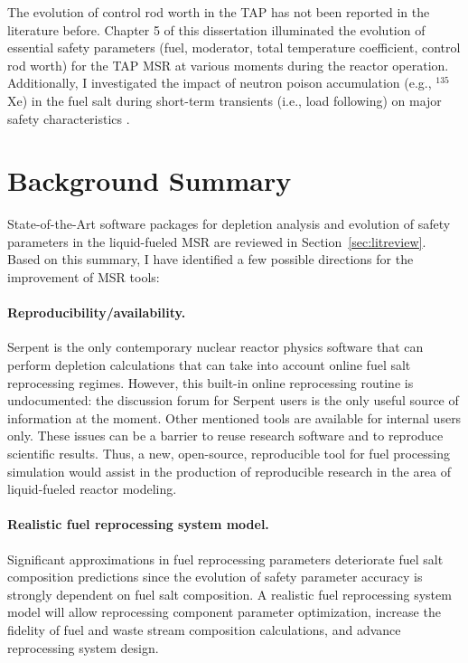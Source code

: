 The evolution of control rod worth in the \gls{TAP} has not been reported in 
the literature before. Chapter 5 of this dissertation illuminated the 
evolution of essential safety parameters (fuel, moderator, total temperature 
coefficient, control rod worth) for the \gls{TAP} \gls{MSR} at various moments 
during the reactor operation. Additionally, I investigated the impact of 
neutron poison accumulation (e.g., $^{135}$Xe) in the fuel salt during 
short-term transients (i.e., load following) on major safety characteristics 
\cite{rykhlevskii_impact_2019}.


\section{Background Summary}
State-of-the-Art software packages for depletion analysis and evolution of 
safety parameters in the liquid-fueled \gls{MSR} are reviewed in 
Section~\ref{sec:litreview}. Based on this summary, I have identified a few 
possible directions for the improvement of \gls{MSR} tools:
\paragraph*{Reproducibility/availability.}
Serpent is the only contemporary nuclear reactor physics software that can 
perform depletion calculations that can take into account online fuel salt 
reprocessing regimes. However, this built-in online reprocessing routine is 
undocumented: the discussion forum for Serpent users is the only useful 
source of information at the moment. Other mentioned tools are available for 
internal users only. These issues can be a barrier to reuse research software 
and to reproduce scientific results. Thus, a new, open-source, reproducible 
tool for fuel processing simulation would assist in the production of 
reproducible research in the area of liquid-fueled reactor modeling.
\paragraph*{Realistic fuel reprocessing system model.} 
Significant approximations in fuel reprocessing parameters deteriorate fuel 
salt composition predictions since the evolution of safety parameter accuracy 
is strongly dependent on fuel salt composition. A realistic fuel reprocessing 
system model will allow reprocessing component parameter optimization,  
increase the fidelity of fuel and waste stream composition calculations, and 
advance reprocessing system design.
